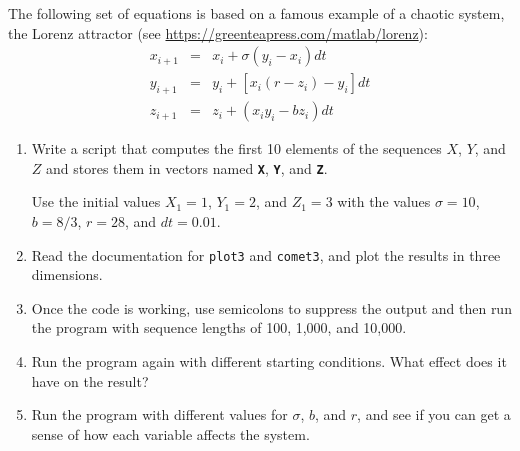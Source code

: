 \begin{ex}
  The following set of equations is based on a famous example of a chaotic system, the Lorenz attractor (see \url{https://greenteapress.com/matlab/lorenz}):
%
\begin{eqnarray*}
x_{i+1} &=& x_i + \sigma \left( y_i - x_i \right) dt  \\
y_{i+1} &=& y_i + \left[ x_i (r - z_i) - y_i \right] dt   \\
z_{i+1} &=& z_i + \left( x_i y_i - b z_i \right) dt
\end{eqnarray*}
%
\begin{enumerate}

\item Write a script that computes the first 10 elements of the sequences
$X$, $Y$, and $Z$ and stores them in vectors named \textbf{\lstinline{X}}, \textbf{\lstinline{Y}},
and \textbf{\lstinline{Z}}.

Use the initial values $X_1 = 1$, $Y_1 = 2$, and $Z_1 = 3$ with the values
$\sigma = 10$, $b = 8/3$, $r = 28$, and $dt = 0.01$.

\item Read the documentation for \lstinline{plot3} and \lstinline{comet3}, and
plot the results in three dimensions.

\item Once the code is working, use semicolons to suppress the output
and then run the program with sequence lengths of 100, 1,000, and 10,000.

\item Run the program again with different starting conditions.
What effect does it have on the result?

\item Run the program with different values for $\sigma$, $b$, and $r$,
and see if you can get a sense of how each variable affects the
system.

\end{enumerate}


\end{ex}


